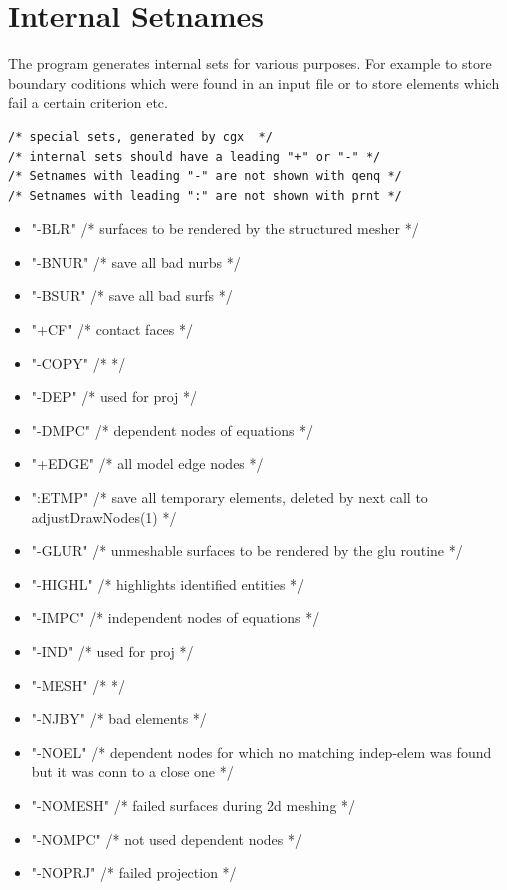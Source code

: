 \documentclass{article}
\begin{document}
 \section{\label{Internal Setnames}Internal Setnames}
 The program generates internal sets for various purposes. For example to store boundary coditions which were found in an input file or to store elements which fail a certain criterion etc.
\begin{verbatim}
/* special sets, generated by cgx  */
/* internal sets should have a leading "+" or "-" */
/* Setnames with leading "-" are not shown with qenq */ 
/* Setnames with leading ":" are not shown with prnt */ 
\end{verbatim}
\begin{itemize}
\item      "-BLR"    /*  surfaces to be rendered by the structured mesher */
\item      "-BNUR"   /* save all bad nurbs */
\item      "-BSUR"   /* save all bad surfs */
\item      "+CF"     /* contact faces */
\item      "-COPY"   /*  */
\item      "-DEP"    /* used for proj */
\item      "-DMPC"   /* dependent nodes of equations    */
\item      "+EDGE"   /* all model edge nodes */
\item      ":ETMP"   /* save all temporary elements, deleted by next call to adjustDrawNodes(1) */
\item      "-GLUR"    /* unmeshable surfaces to be rendered by the glu routine */
\item      "-HIGHL"  /* highlights identified entities */
\item      "-IMPC"   /* independent nodes of equations  */
\item      "-IND"    /* used for proj  */
\item      "-MESH"   /*  */
\item      "-NJBY"   /* bad elements */ 
\item      "-NOEL"   /* dependent nodes for which no matching indep-elem was found but it was conn to a close one */
\item      "-NOMESH" /* failed surfaces during 2d meshing */
\item      "-NOMPC"  /* not used dependent nodes */
\item      "-NOPRJ"  /* failed projection */

\end{itemize}
\end{document}
